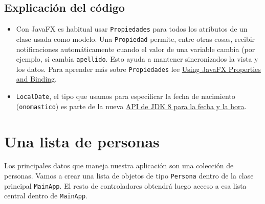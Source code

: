\subsection{Explicación del código}
\begin{itemize}
	\item Con JavaFX es habitual usar \textcolor{codigo}{\texttt{Propiedades}} para todos los atributos de un clase usada como modelo. Una \textcolor{codigo}{\texttt{Propiedad}} permite, entre otras cosas, recibir notificaciones automáticamente cuando el valor de una variable cambia (por ejemplo, si cambia \textcolor{codigo}{\texttt{apellido}}. Esto ayuda a mantener sincronizados la vista y los datos. Para aprender más sobre \textcolor{codigo}{\texttt{Propiedades}} lee \textcolor{azul}{\href{https://docs.oracle.com/javase/8/javafx/properties-binding-tutorial/binding.htm}{Using JavaFX Properties and Binding}}.
	\item \textcolor{codigo}{\texttt{LocalDate}}, el tipo que usamos para especificar la fecha de nacimiento (\textcolor{codigo}{\texttt{onomastico}}) es parte de la nueva \textcolor{azul}{\href{https://docs.oracle.com/javase/tutorial/datetime/iso/}{API de JDK 8 para la fecha y la hora}}.
\end{itemize}

\section{Una lista de personas}
Los principales datos que maneja nuestra aplicación son una colección de personas. Vamos a crear una lista de objetos de tipo \textcolor{codigo}{\texttt{Persona}} dentro de la clase principal \textcolor{codigo}{\texttt{MainApp}}. El resto de controladores obtendrá luego acceso a esa lista central dentro de \textcolor{codigo}{\texttt{MainApp}}.

